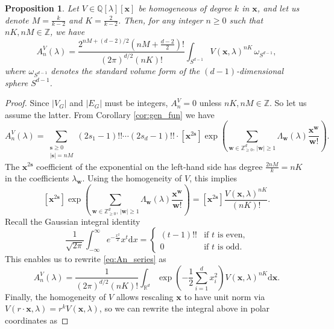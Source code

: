 \documentclass[11pt, a4paper]{article}
\numberwithin{theorem}{section}
\newtheorem{proposition}[theorem]{Proposition}
\theoremstyle{remark}
\newcommand{\RR}{\mathbb{R}}
\newcommand{\QQ}{\mathbb{Q}}
\newcommand{\ZZ}{\mathbb{Z}}
\renewcommand{\d}{\mathrm{d}}
\newcommand{\bb}[1]{\boldsymbol{#1}}
\theoremstyle{theorem}
\begin{document}
\begin{proposition}
  \label{prop:An_exp_integral}
  Let $V\in \QQ[\lambda][\bb{x}]$ be homogeneous of degree $k$ in $\bb{x}$, and let us denote $M = \tfrac{k}{k-2}$ and $K = \tfrac{2}{k-2}$. Then, for any integer $n\geq 0$ such that $nK,nM\in\ZZ$, we have
  \begin{equation}
    \label{eq:An_exp_integral}
    A^V_n (\lambda) = \frac{2^{nM + (d-2)/2} \left(nM +\frac{d-2}{2}\right)!}{(2\pi)^{d/2} (nK)!} \int_{S^{d-1}} V(\bb{x},\lambda)^{nK} \,\omega_{S^{d-1}},
  \end{equation}
  where $\omega_{S^{d-1}}$ denotes the standard volume form of the $(d-1)$-dimensional sphere $S^{d-1}$.
\end{proposition}

\begin{proof}
  Since $|V_G|$ and $|E_G|$ must be integers, $A^V_n = 0$ unless $nK,nM\in\ZZ$. So let us assume the latter. From Corollary \ref{cor:gen_fun} we have 
  \begin{equation}
    \label{eq:An_series}
    A^V_n(\lambda) = \sum_{\substack{\bb{s} \geq 0 \\ |\bb{s}| = nM}} (2s_1-1)!!\cdots (2s_d-1)!!\cdot [\bb{x}^{2\bb{s}}]\exp\left( \sum_{\bb{w}\in \ZZ^d_{\geq 0},\, |\bb{w}| \geq 1} \Lambda_{\bb{w}}(\lambda) \frac{\bb{x}^{\bb{w}}}{\bb{w}!} \right).
  \end{equation}
  The $\bb{x}^{2\bb{s}}$ coefficient of the exponential on the left-hand side has degree $\tfrac{2nM}{k} = nK$ in the coefficients $\lambda_{\bb{w}}$. Using the homogeneity of $V$, this implies
  \[
    [\bb{x}^{2\bb{s}}]\exp\left( \sum_{\bb{w}\in \ZZ^d_{\geq 0},\, |\bb{w}| \geq 1} \Lambda_{\bb{w}}(\lambda) \frac{\bb{x}^{\bb{w}}}{\bb{w}!} \right) = [\bb{x}^{2\bb{s}}] \frac{V(\bb{x},\lambda)^{nK}}{(nK)!}.
  \]
  Recall the Gaussian integral identity
  \[
    \frac{1}{\sqrt{2\pi}} \int_{-\infty}^{\infty} e^{-\frac{x^2}{2}} x^t \d x = \left\{ \begin{array}{ll}
      (t-1)!! & \text{if } t \text{ is even,} \\
      0 & \text{if } t \text{ is odd.}
    \end{array} \right.
  \]
  This enables us to rewrite \eqref{eq:An_series} as 
  \[
    A^V_n(\lambda) = \frac{1}{(2\pi)^{d/2} (nK)!} \int_{\RR^d} \exp\left( -\frac{1}{2} \sum_{i=1}^{d} x_i^2 \right) V(\bb{x},\lambda)^{nK} \d\bb{x}.
  \]
  Finally, the homogeneity of $V$ allows rescaling $\bb{x}$ to have unit norm via $V(r\cdot \bb{x},\lambda) = r^k V(\bb{x},\lambda)$, so we can rewrite the integral above in polar coordinates as

\end{proof}
\end{document}

